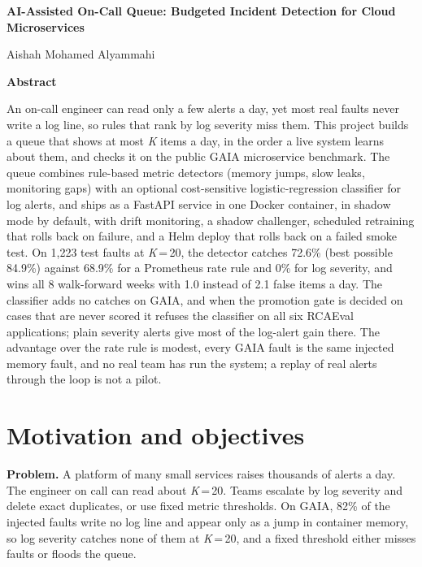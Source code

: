 \documentclass[12pt,a4paper]{article}
\begin{document}
\raggedbottom
\begin{center}
{\fontsize{16}{19}\selectfont\bfseries AI-Assisted On-Call Queue: Budgeted Incident Detection for Cloud Microservices\par}
\vspace{6pt}
Aishah Mohamed Alyammahi
\end{center}

\vspace{-4pt}
\begin{center}\textbf{Abstract}\end{center}
\vspace{-8pt}
\begin{justify}
An on-call engineer can read only a few alerts a day, yet most real faults never write a log line, so rules that rank by log severity miss them. This project builds a queue that shows at most \textit{K} items a day, in the order a live system learns about them, and checks it on the public GAIA microservice benchmark. The queue combines rule-based metric detectors (memory jumps, slow leaks, monitoring gaps) with an optional cost-sensitive logistic-regression classifier for log alerts, and ships as a FastAPI service in one Docker container, in shadow mode by default, with drift monitoring, a shadow challenger, scheduled retraining that rolls back on failure, and a Helm deploy that rolls back on a failed smoke test. On 1{,}223 test faults at \textit{K}\,=\,20, the detector catches 72.6\% (best possible 84.9\%) against 68.9\% for a Prometheus rate rule and 0\% for log severity, and wins all 8 walk-forward weeks with 1.0 instead of 2.1 false items a day. The classifier adds no catches on GAIA, and when the promotion gate is decided on cases that are never scored it refuses the classifier on all six RCAEval applications; plain severity alerts give most of the log-alert gain there. The advantage over the rate rule is modest, every GAIA fault is the same injected memory fault, and no real team has run the system; a replay of real alerts through the loop is not a pilot.
\end{justify}

\section{Motivation and objectives}
\textbf{Problem.} A platform of many small services raises thousands of alerts a day. The engineer on call can read about \textit{K}\,=\,20. Teams escalate by log severity and delete exact duplicates, or use fixed metric thresholds. On GAIA, 82\% of the injected faults write no log line and appear only as a jump in container memory, so log severity catches none of them at \textit{K}\,=\,20, and a fixed threshold either misses faults or floods the queue.
\end{document}
